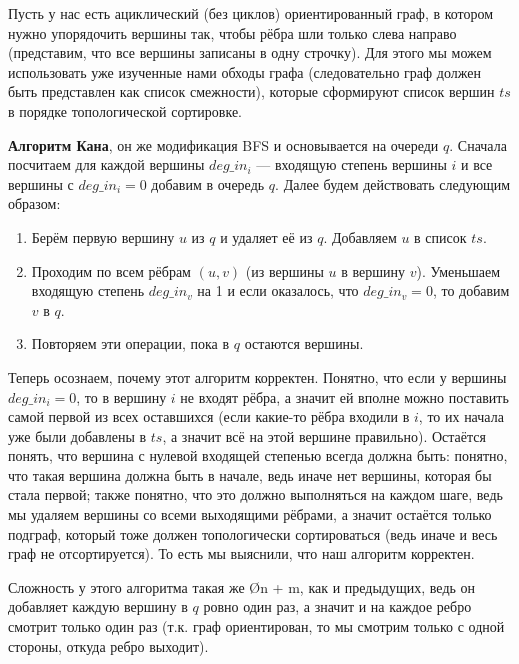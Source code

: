 Пусть у нас есть ациклический (без циклов) ориентированный граф, в котором нужно упорядочить вершины так, чтобы рёбра шли только слева направо (представим, что все вершины записаны в одну строчку). Для этого мы можем использовать уже изученные нами обходы графа (следовательно граф должен быть представлен как список смежности), которые сформируют список вершин $ts$ в порядке топологической сортировке. 

\textbf{Алгоритм Кана}, он же модификация BFS и основывается на очереди $q$. Сначала посчитаем для каждой вершины $deg\_in_i$ — входящую степень вершины $i$ и все вершины с $deg\_in_i = 0$ добавим в очередь $q$. Далее будем действовать следующим образом:

\begin{box-algo}
    \begin{enumerate}
        \item Берём первую вершину $u$ из $q$ и удаляет её из $q$. Добавляем $u$ в список $ts$.
        \item Проходим по всем рёбрам $(u, v)$ (из вершины $u$ в вершину $v$). Уменьшаем входящую степень $deg\_in_v$ на 1 и если оказалось, что $deg\_in_v = 0$, то добавим $v$ в $q$.
        \item Повторяем эти операции, пока в $q$ остаются вершины.
    \end{enumerate}
\end{box-algo}

Теперь осознаем, почему этот алгоритм корректен. Понятно, что если у вершины $deg\_in_i = 0$, то в вершину $i$ не входят рёбра, а значит ей вполне можно поставить самой первой из всех оставшихся (если какие-то рёбра входили в $i$, то их начала уже были добавлены в $ts$, а значит всё на этой вершине правильно). Остаётся понять, что вершина с нулевой входящей степенью всегда должна быть: понятно, что такая вершина должна быть в начале, ведь иначе нет вершины, которая бы стала первой; также понятно, что это должно выполняться на каждом шаге, ведь мы удаляем вершины со всеми выходящими рёбрами, а значит остаётся только подграф, который тоже должен топологически сортироваться (ведь иначе и весь граф не отсортируется). То есть мы выяснили, что наш алгоритм корректен.

Сложность у этого алгоритма такая же \O{n + m}, как и предыдущих, ведь он добавляет каждую вершину в $q$ ровно один раз, а значит и на каждое ребро смотрит только один раз (т.к. граф ориентирован, то мы смотрим только с одной стороны, откуда ребро выходит).

